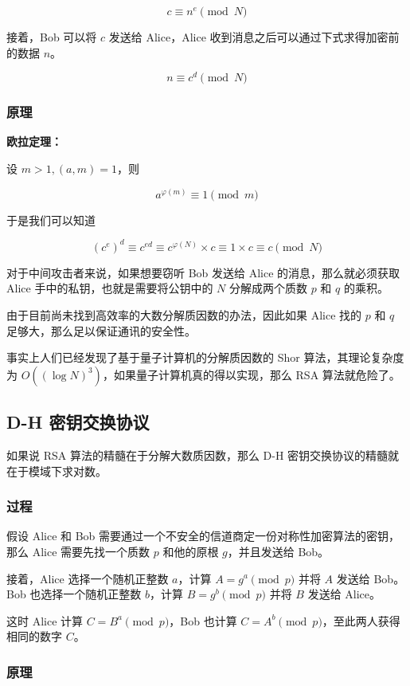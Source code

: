 \documentclass[hyperref,UTF8,12pt,a4paper]{ctexart}
\begin{document}
$$
c \equiv n^e \pmod N
$$

接着，Bob 可以将 $c$ 发送给 Alice，Alice 收到消息之后可以通过下式求得加密前的数据 $n$。

$$
n \equiv c^d \pmod N
$$

\subsubsection{原理}

\textbf{欧拉定理：}

设 $m > 1, (a, m) = 1$，则

$$
a^{\varphi(m)} \equiv 1 \pmod m
$$

于是我们可以知道

$$
(c^e)^d \equiv c^{ed} \equiv c^{\varphi(N)} \times c \equiv 1 \times c \equiv c \pmod N
$$

对于中间攻击者来说，如果想要窃听 Bob 发送给 Alice 的消息，那么就必须获取 Alice 手中的私钥，也就是需要将公钥中的 $N$ 分解成两个质数 $p$ 和 $q$ 的乘积。

由于目前尚未找到高效率的大数分解质因数的办法，因此如果 Alice 找的 $p$ 和 $q$ 足够大，那么足以保证通讯的安全性。

事实上人们已经发现了基于量子计算机的分解质因数的 Shor 算法，其理论复杂度为 $O((\log N) ^ 3)$，如果量子计算机真的得以实现，那么 RSA 算法就危险了。

\subsection{D-H 密钥交换协议}

如果说 RSA 算法的精髓在于分解大数质因数，那么 D-H 密钥交换协议的精髓就在于模域下求对数。

\subsubsection{过程}

假设 Alice 和 Bob 需要通过一个不安全的信道商定一份对称性加密算法的密钥，那么 Alice 需要先找一个质数 $p$ 和他的原根 $g$，并且发送给 Bob。

接着，Alice 选择一个随机正整数 $a$，计算 $A=g^a \pmod p$ 并将 $A$ 发送给 Bob。Bob 也选择一个随机正整数 $b$，计算 $B=g^b \pmod p$ 并将 $B$ 发送给 Alice。

这时 Alice 计算 $C = B^a \pmod p$，Bob 也计算 $C = A^b \pmod p$，至此两人获得相同的数字 $C$。

\subsubsection{原理}
\end{document}
